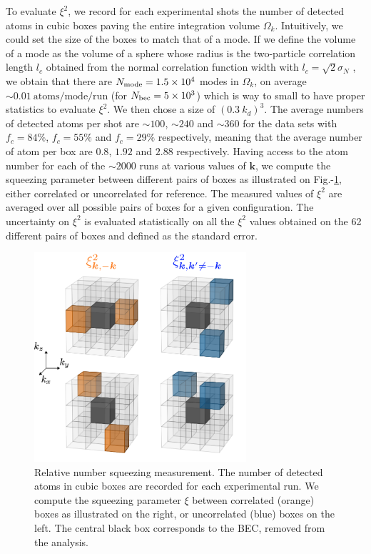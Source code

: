 To evaluate $\xi^2$, we record for each experimental shots the number of detected atoms in cubic boxes paving the entire integration volume $\Omega_k$. Intuitively, we could set the size of the boxes to match that of a mode. If we define the volume of a mode as the volume of a sphere whose radius is the two-particle correlation length $l_c$ obtained from the normal correlation function width with $l_c = \sqrt{2} \sigma_N$ \cite{carcy2019momentum}, we obtain that there are $N_{\rm{mode}} = 1.5 \times 10^4$ modes in $\Omega_k$, \ie on average $\sim 0.01 \ \text{atoms/mode/run}$ (for $N_{\rm{bec}}=5 \times 10^3$) which is way to small to have proper statistics to evaluate $\xi^2$. We then chose a size of $(0.3 \ k_d)^3$. The average numbers of detected atoms per shot are $\sim 100$, $\sim 240$ and $\sim 360$ for the data sets with $f_c=84\%$, $f_c=55\%$ and $f_c=29\%$ respectively, meaning that the average number of atom per box are $0.8$, $1.92$ and $2.88$ respectively. Having access to the atom number for each of the $\sim 2000$ runs at various values of $\bm{k}$, we compute the squeezing parameter between different pairs of boxes as illustrated on Fig.-\ref{fig:squeezing}, either correlated or uncorrelated for reference. The measured values of $\xi^2$ are averaged over all possible pairs of boxes for a given configuration. The uncertainty on $\xi^2$ is evaluated statistically on all the $\xi^2$ values obtained on the 62 different pairs of boxes and defined as the standard error.

\begin{figure}
    \centering
    \includegraphics[width=0.7\textwidth]{Fig/Chapter4/squeezing.png}
    \caption[Relative number squeezing measurement]{Relative number squeezing measurement. The number of detected atoms in cubic boxes are recorded for each experimental run. We compute the squeezing parameter $\xi$ between correlated (orange) boxes as illustrated on the right, or uncorrelated (blue) boxes on the left. The central black box corresponds to the BEC, removed from the analysis.}
    \label{fig:squeezing}
\end{figure}

